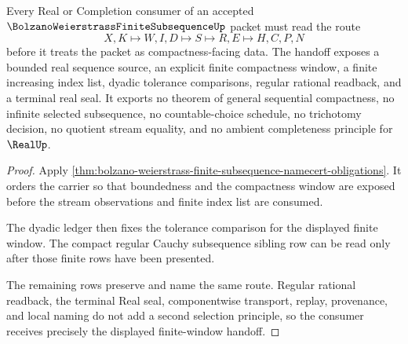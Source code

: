 \begin{theorem}
\label{thm:bolzano-weierstrass-finite-subsequence-window-handoff}
Every Real or Completion consumer of an accepted $\BolzanoWeierstrassFiniteSubsequenceUp$ packet must read the route
$$
X,K \longmapsto W,I,D \longmapsto S \longmapsto R,E \longmapsto H,C,P,N
$$
before it treats the packet as compactness-facing data. The handoff exposes a bounded real sequence source, an explicit finite compactness window, a finite increasing index list, dyadic tolerance comparisons, regular rational readback, and a terminal real seal. It exports no theorem of general sequential compactness, no infinite selected subsequence, no countable-choice schedule, no trichotomy decision, no quotient stream equality, and no ambient completeness principle for $\RealUp$.
\end{theorem}
\begin{proof}
Apply \autoref{thm:bolzano-weierstrass-finite-subsequence-namecert-obligations}. It orders the carrier so that boundedness and the compactness window are exposed before the stream observations and finite index list are consumed.

The dyadic ledger then fixes the tolerance comparison for the displayed finite window. The compact regular Cauchy subsequence sibling row can be read only after those finite rows have been presented.

The remaining rows preserve and name the same route. Regular rational readback, the terminal Real seal, componentwise transport, replay, provenance, and local naming do not add a second selection principle, so the consumer receives precisely the displayed finite-window handoff.
\end{proof}


